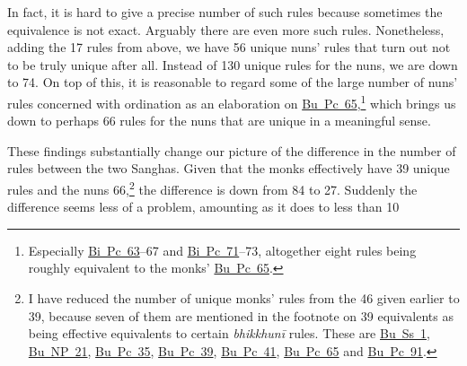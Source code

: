 \documentclass[12pt,openany]{book}%
\begin{document}
In fact, it is hard to give a precise number of such rules because sometimes the equivalence is not exact. Arguably there are even more such rules. Nonetheless, adding the 17 rules from above, we have 56 unique nuns’ rules that turn out not to be truly unique after all. Instead of 130 unique rules for the nuns, we are down to 74. On top of this, it is reasonable to regard some of the large number of nuns’ rules concerned with ordination as an elaboration on \href{https://suttacentral.net/pli-tv-bu-vb-pc65/en/brahmali\#1.53.1}{Bu~Pc~65},\footnote{Especially \href{https://suttacentral.net/pli-tv-bi-vb-pc63/en/brahmali\#1.41.1}{Bi~Pc~63}–67 and \href{https://suttacentral.net/pli-tv-bi-vb-pc71/en/brahmali\#1.17.1}{Bi~Pc~71}–73, altogether eight rules being roughly equivalent to the monks’ \href{https://suttacentral.net/pli-tv-bu-vb-pc65/en/brahmali\#1.53.1}{Bu~Pc~65}. } which brings us down to perhaps 66 rules for the nuns that are unique in a meaningful sense.

These findings substantially change our picture of the difference in the number of rules between the two Sanghas. Given that the monks effectively have 39 unique rules and the nuns 66,\footnote{I have reduced the number of unique monks’ rules from the 46 given earlier to 39, because seven of them are mentioned in the footnote on 39 equivalents as being effective equivalents to certain \textit{\textsanskrit{bhikkhunī}} rules. These are \href{https://suttacentral.net/pli-tv-bu-vb-ss1/en/brahmali\#2.1.13.1}{Bu~Ss~1}, \href{https://suttacentral.net/pli-tv-bu-vb-np21/en/brahmali\#2.17.1}{Bu~NP~21}, \href{https://suttacentral.net/pli-tv-bu-vb-pc35/en/brahmali\#2.15.1}{Bu~Pc~35}, \href{https://suttacentral.net/pli-tv-bu-vb-pc39/en/brahmali\#2.10.1}{Bu~Pc~39}, \href{https://suttacentral.net/pli-tv-bu-vb-pc41/en/brahmali\#1.2.15.1}{Bu~Pc~41}, \href{https://suttacentral.net/pli-tv-bu-vb-pc65/en/brahmali\#1.53.1}{Bu~Pc~65} and \href{https://suttacentral.net/pli-tv-bu-vb-pc91/en/brahmali\#1.14.1}{Bu~Pc~91}. } the difference is down from 84 to 27. Suddenly the difference seems less of a problem, amounting as it does to less than 10%
\end{document}
